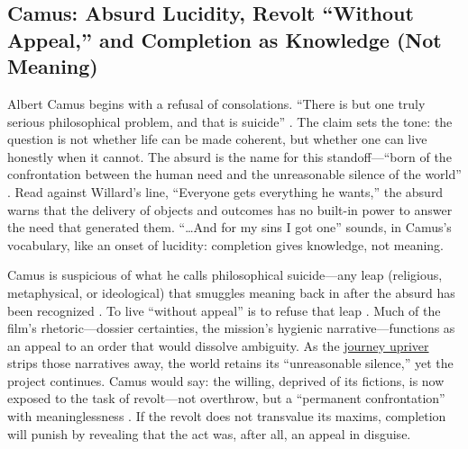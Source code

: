 \subsection*{Camus: Absurd Lucidity, Revolt ``Without Appeal,'' and Completion as Knowledge
	(Not Meaning)}
\label{ssec:iii-camus}
Albert Camus begins with a refusal of consolations. ``There is but one truly serious philosophical
problem, and that is suicide'' \parencite[p.~3]{CamusMyth1991}. The claim sets the tone: the
question is not whether life can be made coherent, but whether one can live honestly when it
cannot. The absurd is the name for this standoff—``born of the confrontation between the human
need and the unreasonable silence of the world'' \parencite[p.~28]{CamusMyth1991}. Read against
Willard's line, ``Everyone gets everything he wants,'' the absurd warns that the delivery of
objects and outcomes has no built-in power to answer the need that generated them. ``\ldots And
for my sins I got one'' sounds, in Camus's vocabulary, like an onset of lucidity: completion
gives knowledge, not meaning.

Camus is suspicious of what he calls philosophical suicide—any leap (religious, metaphysical,
or ideological) that smuggles meaning back in after the absurd has been recognized
\parencite[pp.~53--58]{CamusMyth1991}. To live ``without appeal'' is to refuse that leap
\parencite[p.~54]{CamusMyth1991}. Much of the film's rhetoric—dossier certainties, the mission's
hygienic narrative—functions as an appeal to an order that would dissolve ambiguity. As the
\hyperref[scene:upriver-journey]{journey upriver} strips those narratives away, the world
retains its ``unreasonable silence,'' yet the project continues. Camus would say: the willing,
deprived of its fictions, is now exposed to the task of revolt—not overthrow, but a
``permanent confrontation'' with meaninglessness \parencite[p.~55]{CamusMyth1991}. If the
revolt does not transvalue its maxims, completion will punish by revealing that the act was,
after all, an appeal in disguise.

